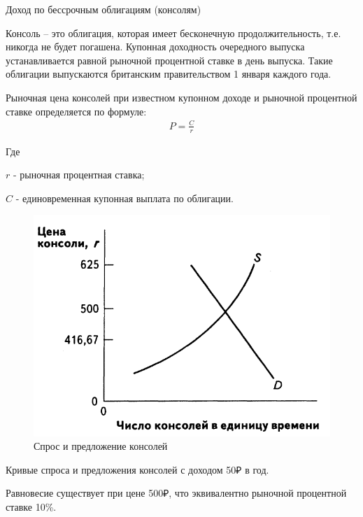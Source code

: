 \documentclass[_DKB_p1_Money.tex]{subfiles}
\begin{document}
\begin{frame}{Доход по бессрочным облигациям (консолям)}
\begin{block}{Консоль }
\quad
– это облигация, которая имеет бесконечную продолжительность, т.е. никогда не будет погашена. Купонная доходность очередного выпуска устанавливается равной рыночной процентной ставке в день выпуска. Такие облигации выпускаются британским правительством 1 января каждого года.
\end{block}
\end{frame}
\begin{frame}
Рыночная цена консолей при известном купонном доходе и рыночной процентной ставке определяется по формуле:
\begin{align}
P=\frac{C}{r}
\end{align}

Где 

$r$ - рыночная процентная ставка;

$C$ - единовременная купонная выплата по облигации.
\end{frame}

\begin{frame}{}
\begin{figure}
\center
\includegraphics[scale=0.3]{img/ir_console}
\caption{Спрос и предложение консолей}
\end{figure}

Кривые спроса и предложения консолей с доходом 50₽ в год. 

Равновесие существует при цене 500₽, что эквивалентно рыночной процентной ставке 10\%.
\end{frame}
\end{document}
